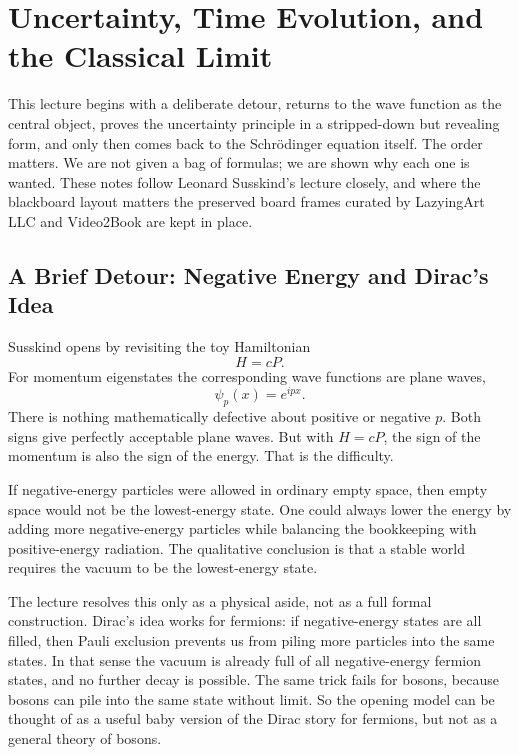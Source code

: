 \chapter{Uncertainty, Time Evolution, and the Classical Limit}

This lecture begins with a deliberate detour, returns to the wave function as the central object, proves the uncertainty principle in a stripped-down but revealing form, and only then comes back to the Schr\"odinger equation itself. The order matters. We are not given a bag of formulas; we are shown why each one is wanted. These notes follow Leonard Susskind's lecture closely, and where the blackboard layout matters the preserved board frames curated by LazyingArt LLC and Video2Book are kept in place.

\section{A Brief Detour: Negative Energy and Dirac's Idea}

Susskind opens by revisiting the toy Hamiltonian
\begin{equation}
H=cP.
\end{equation}
For momentum eigenstates the corresponding wave functions are plane waves,
\begin{equation}
\psi_p(x)=e^{ipx}.
\end{equation}
There is nothing mathematically defective about positive or negative \(p\). Both signs give perfectly acceptable plane waves. But with \(H=cP\), the sign of the momentum is also the sign of the energy. That is the difficulty.

If negative-energy particles were allowed in ordinary empty space, then empty space would not be the lowest-energy state. One could always lower the energy by adding more negative-energy particles while balancing the bookkeeping with positive-energy radiation. The qualitative conclusion is that a stable world requires the vacuum to be the lowest-energy state.

The lecture resolves this only as a physical aside, not as a full formal construction. Dirac's idea works for fermions: if negative-energy states are all filled, then Pauli exclusion prevents us from piling more particles into the same states. In that sense the vacuum is already full of all negative-energy fermion states, and no further decay is possible. The same trick fails for bosons, because bosons can pile into the same state without limit. So the opening model can be thought of as a useful baby version of the Dirac story for fermions, but not as a general theory of bosons.

